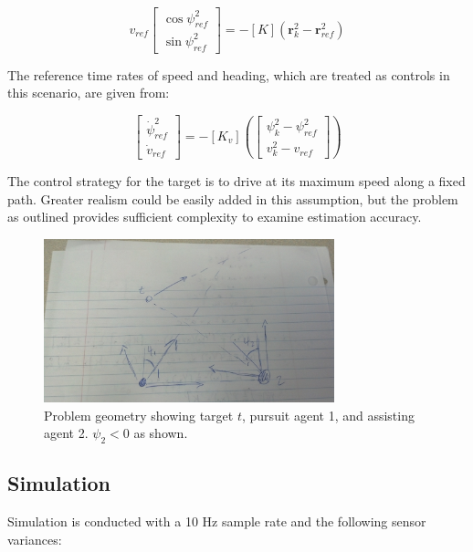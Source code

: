 \documentclass{aiaa-tc}
\newcommand{\B}[1]{\textbf{#1}} %
\begin{document}
\begin{equation}
v_{ref}\begin{bmatrix}
\cos{\psi^2_{ref}}\\
\sin{\psi^2_{ref}}
\end{bmatrix} = -[K](\B{r}^2_k - \B{r}^2_{ref})
\end{equation}

The reference time rates of speed and heading, which are treated as controls in this scenario, are given from:

\begin{equation}
\begin{bmatrix}
\dot{\psi}^2_{ref}\\
\dot{v}_{ref}
\end{bmatrix} = 
-[K_v]\left(\begin{bmatrix}
\psi^2_k - \psi^2_{ref}\\
v^2_k - v_{ref}
\end{bmatrix}\right)
\end{equation}

The control strategy for the target is to drive at its maximum speed along a fixed path. Greater realism could be easily added in this assumption, but the problem as outlined provides sufficient complexity to examine estimation accuracy.

\begin{figure}
\centering
\includegraphics[trim = 250mm 50mm 175mm 50mm,clip = true,width=0.75\textwidth]{target_chase.jpg}
\caption{ Problem geometry showing target $t$, pursuit agent 1, and assisting agent 2. $\psi_2 < 0$ as shown. }
\label{fig:target_chase}
\end{figure}

\subsection{Simulation}

Simulation is conducted with a 10 Hz sample rate and the following sensor variances:
\end{document}
